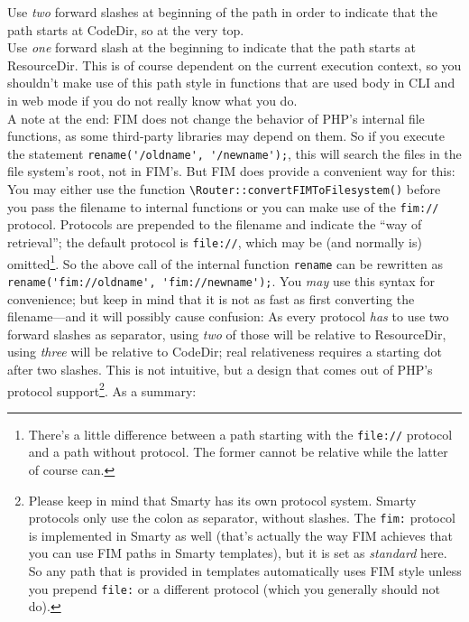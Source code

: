 \documentclass{scrartcl}
\begin{document}
\begin{itemize}
            Use \emph{two} forward slashes at beginning of the path in order to indicate that the path starts at CodeDir, so at the very top. \\
            Use \emph{one} forward slash at the beginning to indicate that the path starts at ResourceDir. This is of course dependent on the current execution context, so you shouldn't make use of this path style in functions that are used body in CLI and in web mode if you do not really know what you do. \\
            A note at the end: FIM does not change the behavior of PHP's internal file functions, as some third-party libraries may depend on them. So if you execute the statement \lstinline!rename('/oldname', '/newname');!, this will search the files in the file system's root, not in FIM's. But FIM does provide a convenient way for this: You may either use the function \lstinline!\Router::convertFIMToFilesystem()! before you pass the filename to internal functions or you can make use of the \texttt{fim://} protocol. Protocols are prepended to the filename and indicate the ``way of retrieval''; the default protocol is \texttt{file://}, which may be (and normally is) omitted\footnote{There's a little difference between a path starting with the \texttt{file://} protocol and a path without protocol. The former cannot be relative while the latter of course can.}. So the above call of the internal function \lstinline!rename! can be rewritten as \lstinline!rename('fim://oldname', 'fim://newname');!. You \emph{may} use this syntax for convenience; but keep in mind that it is not as fast as first converting the filename---and it will possibly cause confusion: As every protocol \emph{has} to use two forward slashes as separator, using \emph{two} of those will be relative to ResourceDir, using \emph{three} will be relative to CodeDir; real relativeness requires a starting dot after two slashes. This is not intuitive, but a design that comes out of PHP's protocol support\footnote{Please keep in mind that Smarty has its own protocol system. Smarty protocols only use the colon as separator, without slashes. The \texttt{fim:} protocol is implemented in Smarty as well (that's actually the way FIM achieves that you can use FIM paths in Smarty templates), but it is set as \emph{standard} here. So any path that is provided in templates automatically uses FIM style unless you prepend \texttt{file:} or a different protocol (which you generally should not do).}. As a summary: \vspace*{-.5\baselineskip}
            \begin{multicols}{2}

\end{multicols}
\end{itemize}
\end{document}

